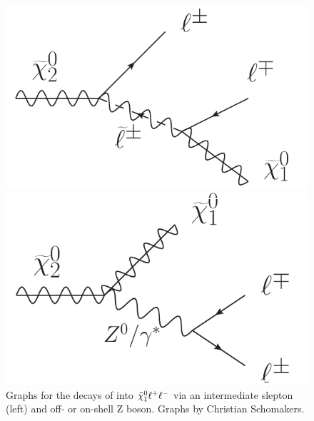 \begin{figure}[htbp]
\centering
\begin{minipage}[t]{0.49\textwidth}
  \includegraphics[width=\textwidth]{plots/THEO/FeynmanGraph_slepton.pdf}
\end{minipage}
\begin{minipage}[t]{0.49\textwidth}
\includegraphics[width=\textwidth]{plots/THEO/FeynmanGraph_Z_decay.pdf}
\end{minipage}
\caption{Graphs for the decays of \secondchi into ${\tilde{\chi}^0_1}\ell^+\ell^-$ via an intermediate slepton (left) and off- or on-shell Z boson. Graphs by Christian Schomakers.}
\label{fig:edgeFeyn}
\end{figure}

